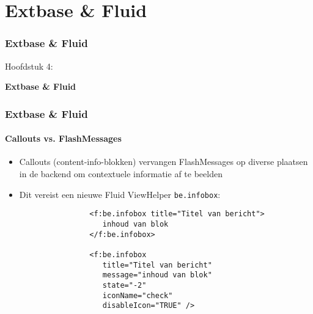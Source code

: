 %

\section{Extbase \& Fluid}
\begin{frame}[fragile]
	\frametitle{Extbase \& Fluid}

	\begin{center}\huge{Hoofdstuk 4:}\end{center}
	\begin{center}\huge{\color{typo3darkgrey}\textbf{Extbase \& Fluid}}\end{center}

\end{frame}


\begin{frame}[fragile]
	\frametitle{Extbase \& Fluid}
	\framesubtitle{Callouts vs. FlashMessages}

	\begin{itemize}

		\item Callouts (content-info-blokken) vervangen FlashMessages op diverse plaatsen
			in de backend om contextuele informatie af te beelden

		\item Dit vereist een nieuwe Fluid ViewHelper \texttt{be.infobox}:

			\begin{lstlisting}
				<f:be.infobox title="Titel van bericht">
				   inhoud van blok
				</f:be.infobox>

				<f:be.infobox
				   title="Titel van bericht"
				   message="inhoud van blok"
				   state="-2"
				   iconName="check"
				   disableIcon="TRUE" />
			\end{lstlisting}

	\end{itemize}

\end{frame}

